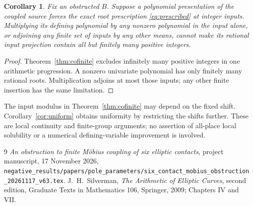 \documentclass[11pt,a4paper]{article}
\newtheorem{corollary}[theorem]{Corollary}
\begin{document}
\begin{corollary}\label{cor:repair}
Fix an obstructed $B$. Suppose a polynomial presentation of the
coupled source forces the exact root prescription
\eqref{eq:prescribed} at integer inputs. Multiplying its defining
polynomial by any nonzero polynomial in the input alone, or
adjoining any finite set of inputs by any other means, cannot
make its rational input projection contain all but finitely many
positive integers.
\end{corollary}
\begin{proof}
Theorem~\ref{thm:cofinite} excludes infinitely many positive
integers in one arithmetic progression. A nonzero univariate
polynomial has only finitely many rational roots. Multiplication
adjoins at most those inputs; any other finite insertion has the
same limitation.
\end{proof}

The input modulus in Theorem~\ref{thm:cofinite} may depend on the
fixed shift. Corollary~\ref{cor:uniform} obtains uniformity by
restricting the shifts further. These are local continuity and
finite-group arguments; no assertion of all-place local solubility
or a numerical defining-variable improvement is involved.

\begin{thebibliography}{9}
\emph{An obstruction to finite M\"obius coupling of six elliptic contacts},
project manuscript, 17 November 2026,
\nolinkurl{negative_results/papers/pole_parameters/six_contact_mobius_obstruction_20261117_v63.tex}.
J.~H.~Silverman, \emph{The Arithmetic of Elliptic Curves},
second edition, Graduate Texts in Mathematics 106,
Springer, 2009; Chapters IV and VII.
\end{thebibliography}
\end{document}
